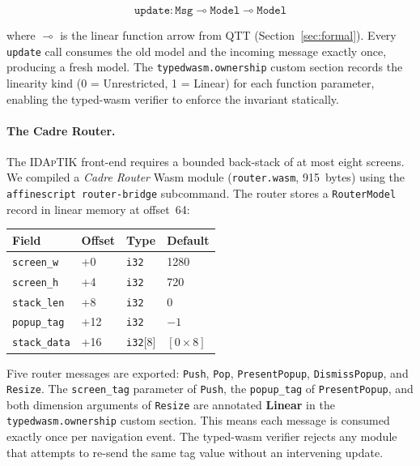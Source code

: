 \documentclass[sigplan,nonacm,screen]{acmart}
\begin{document}
\[
  \mathtt{update} : \mathtt{Msg} \multimap \mathtt{Model} \multimap \mathtt{Model}
\]

where $\multimap$ is the linear function arrow from QTT
(Section~\ref{sec:formal}).  Every \texttt{update} call consumes the old
model and the incoming message exactly once, producing a fresh model.  The
\texttt{typedwasm.ownership} custom section records the linearity kind
(0 = Unrestricted, 1 = Linear) for each function parameter, enabling the
typed-wasm verifier to enforce the invariant statically.

\paragraph{The Cadre Router.}
The \textsc{IDApTIK} front-end requires a bounded back-stack of
at most eight screens.  We compiled a \emph{Cadre Router} Wasm module
(\texttt{router.wasm}, 915~bytes) using the \texttt{affinescript
router-bridge} subcommand.  The router stores a \texttt{RouterModel}
record in linear memory at offset~64:

\begin{center}
\begin{tabular}{@{}llll@{}}
\toprule
\textbf{Field}   & \textbf{Offset} & \textbf{Type} & \textbf{Default} \\
\midrule
\texttt{screen\_w}   & +0  & \texttt{i32} & 1280 \\
\texttt{screen\_h}   & +4  & \texttt{i32} & 720 \\
\texttt{stack\_len}  & +8  & \texttt{i32} & 0 \\
\texttt{popup\_tag}  & +12 & \texttt{i32} & $-1$ \\
\texttt{stack\_data} & +16 & \texttt{i32}[8] & $[0 \times 8]$ \\
\bottomrule
\end{tabular}
\end{center}

Five router messages are exported: \texttt{Push}, \texttt{Pop},
\texttt{PresentPopup}, \texttt{DismissPopup}, and \texttt{Resize}.
The \texttt{screen\_tag} parameter of \texttt{Push}, the \texttt{popup\_tag}
of \texttt{PresentPopup}, and both dimension arguments of \texttt{Resize}
are annotated \textbf{Linear} in the \texttt{typedwasm.ownership}
custom section.  This means each message is consumed exactly once per
navigation event.  The typed-wasm verifier rejects any module that attempts
to re-send the same tag value without an intervening update.
\end{document}
